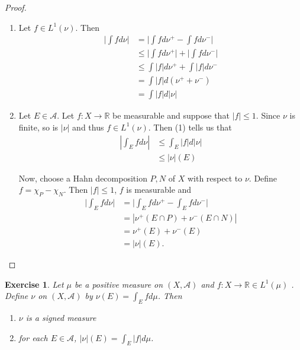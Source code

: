 \documentclass[12pt]{amsart}
\newtheorem{ex}[thm]{Exercise}
\newcommand{\R}{\mathbb{R}}
\newcommand{\MA}{\mathcal{A}}
\begin{document}
\begin{proof}
\begin{enumerate}
\item Let $f \in L^1(\nu)$. Then 
\begin{align*}
\bigg|\int f d \nu \bigg| 
&= \bigg|\int f d \nu^+ - \int f d \nu^-\bigg|\\
& \leq \bigg|\int f d \nu^+\bigg| + \bigg|\int f d \nu^-\bigg|\\
& \leq \int |f| d\nu^+ + \int |f| d\nu^-\\
&= \int |f| d (\nu^+ + \nu^-)\\
&= \int |f| d |\nu|
\end{align*}

\item Let $E \in \MA$. Let $f:X \rightarrow \R$ be measurable and suppose that $|f| \leq 1$. Since $\nu$ is finite, so is $|\nu|$ and thus $f \in L^1(\nu)$. Then (1) tells us that 
\begin{align*}
|\int_E f d \nu| 
& \leq \int_E |f| d |\nu|\\
& \leq |\nu|(E) 
\end{align*}

Now, choose a Hahn decomposition $P,N$ of $X$ with respect to $\nu$. Define $f = \chi_{P} - \chi_{N}$. Then $|f| \leq 1$, $f$ is measurable and 
\begin{align*}
\bigg|\int_E f d\nu\bigg|
&= \bigg|\int_E f d \nu^+ - \int_E f d \nu^-\bigg|\\
&= | \nu^+(E \cap P) + \nu^-(E \cap N)|\\
&= \nu^+(E) + \nu^-(E)\\
&= |\nu|(E).
\end{align*}

\end{enumerate}
\end{proof}

\begin{ex}
Let $\mu$ be a positive measure on $(X, \MA)$ and $f:X \rightarrow \R \in L^1(\mu)$ . Define $\nu$ on $(X, \MA)$ by $\nu(E) = \int_E f d \mu$. Then
\begin{enumerate}
\item $\nu$ is a signed measure
\item for each $E\in \MA$, $|\nu|(E) = \int_E|f|d\mu$.
\end{enumerate} 
\end{ex}
\end{document}
